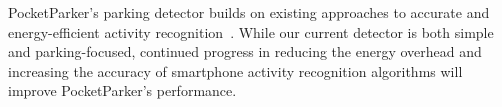 PocketParker's parking detector builds on existing approaches to accurate
and energy-efficient activity recognition~\cite{Constandache:2010:DYS,
Keally:2011:PTP, Reddy:2010:UMP, Yang:2011:DDP, Wang:2009:FEE}. While our
current detector is both simple and parking-focused, continued progress in
reducing the energy overhead and increasing the accuracy of smartphone
activity recognition algorithms will improve PocketParker's performance.
\newline
\newline
